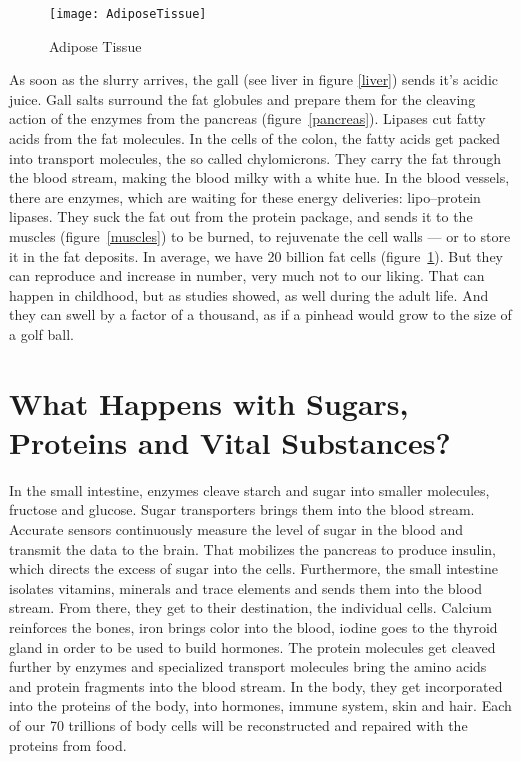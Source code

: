 \documentclass[../main.tex]{subfiles}
\begin{document}
    \begin{figure}[htb!]
    \begin{center}
  \texttt{[image: AdiposeTissue]}
  \caption{Adipose Tissue~\cite{BlausenLimbic}}\label{adipose}
  \end{center}
  \end{figure}


As soon as the slurry arrives, the gall (see liver in figure \ref{liver}) sends it's acidic juice.
Gall salts surround the fat globules and prepare them for the cleaving action of the enzymes from the pancreas (figure~\ref{pancreas}).
Lipases cut fatty acids from the fat molecules.
In the cells of the colon, the fatty acids get packed into transport molecules, the so called chylomicrons.
They carry the fat through the blood stream, making the blood milky with a white hue.
In the blood vessels, there are enzymes, which are waiting for these energy deliveries: lipo--protein lipases.
They suck the fat out from the protein package, and sends it to the muscles (figure~\ref{muscles})
to be burned, to rejuvenate the cell walls --- or to store it in the fat deposits.
In average, we have 20 billion fat cells (figure~\ref{adipose}).
But they can reproduce and increase in number, very much not to our liking.
That can happen in childhood, but as studies showed, as well during the adult life.
And they can swell by a factor of a thousand, as if a pinhead would grow to the size of a golf ball.

\section[What Happens with Food?]{What Happens with Sugars, Proteins and Vital Substances?}

In the small intestine, enzymes cleave starch and sugar into smaller molecules, fructose and glucose.
Sugar transporters brings them into the blood stream.
Accurate sensors continuously measure the level of sugar in the blood and transmit the data to the brain.
That mobilizes the pancreas to produce insulin, which directs the excess of sugar into the cells.
Furthermore, the small intestine isolates vitamins, minerals and trace elements and sends them into the blood stream.
From there, they get to their destination, the individual cells.
Calcium reinforces the bones, iron brings color into the blood, iodine goes to the thyroid gland in order to be used to build hormones.
The protein molecules get cleaved further by enzymes
and specialized transport molecules bring the amino acids and protein fragments into the blood stream.
In the body, they get incorporated into the proteins of the body, into hormones, immune system, skin and hair.
Each of our 70 trillions of body cells will be reconstructed and repaired with the proteins from food.
\end{document}
